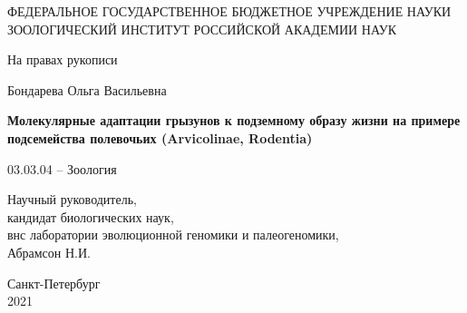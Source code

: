 \thispagestyle{empty}%
\begin{center}%
\MakeUppercase{Федеральное государственное бюджетное учреждение науки Зоологический институт Российской академии наук}
\end{center}%

\vspace{05mm}

\begin{flushright}%
	На правах рукописи
\end{flushright}%
%
\vspace{0pt plus6fill} %
\begin{center}%
{\large Бондарева Ольга Васильевна}
\end{center}%

%
\vspace{0pt plus1fill} %

\begin{center}%
\textbf{\large Молекулярные адаптации грызунов к подземному образу жизни на примере подсемейства полевочьих (Arvicolinae, Rodentia)}

\vspace{0pt plus1fill}

03.03.04 -- Зоология

\end{center}%
%
\vspace{0pt plus4fill} %

\begin{flushright}%
	
Научный руководитель,\\
кандидат биологических наук,\\
внс лаборатории эволюционной геномики и палеогеномики, \\
Абрамсон Н.И.


\end{flushright}%
%
\vspace{0pt plus4fill} %
\begin{center}%
{Санкт-Петербург\\ 2021}
\end{center}%
\newpage
